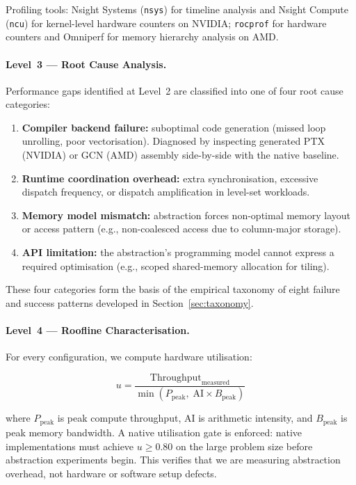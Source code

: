 Profiling tools: Nsight Systems (\texttt{nsys}) for timeline analysis and
Nsight Compute (\texttt{ncu}) for kernel-level hardware counters on NVIDIA;
\texttt{rocprof} for hardware counters and Omniperf for memory hierarchy
analysis on AMD.

\paragraph{Level~3 --- Root Cause Analysis.}
Performance gaps identified at Level~2 are classified into one of four root
cause categories:

\begin{enumerate}
    \item \textbf{Compiler backend failure:} suboptimal code generation (missed
    loop unrolling, poor vectorisation). Diagnosed by inspecting generated
    PTX (NVIDIA) or GCN (AMD) assembly side-by-side with the native baseline.
    \item \textbf{Runtime coordination overhead:} extra synchronisation,
    excessive dispatch frequency, or dispatch amplification in level-set
    workloads.
    \item \textbf{Memory model mismatch:} abstraction forces non-optimal memory
    layout or access pattern (e.g., non-coalesced access due to column-major
    storage).
    \item \textbf{API limitation:} the abstraction's programming model cannot
    express a required optimisation (e.g., scoped shared-memory allocation for
    tiling).
\end{enumerate}

\noindent These four categories form the basis of the empirical taxonomy of
eight failure and success patterns developed in Section~\ref{sec:taxonomy}.

\paragraph{Level~4 --- Roofline Characterisation.}
For every configuration, we compute hardware utilisation:

\begin{equation}
    u = \frac{\text{Throughput}_\text{measured}}
             {\min(P_\text{peak},\; \text{AI} \times B_\text{peak})}
    \label{eq:roofline}
\end{equation}

\noindent where $P_\text{peak}$ is peak compute throughput, AI is arithmetic
intensity, and $B_\text{peak}$ is peak memory bandwidth. A native utilisation
gate is enforced: native implementations must achieve $u \geq 0.80$ on the
large problem size before abstraction experiments begin. This verifies that we
are measuring abstraction overhead, not hardware or software setup defects.

